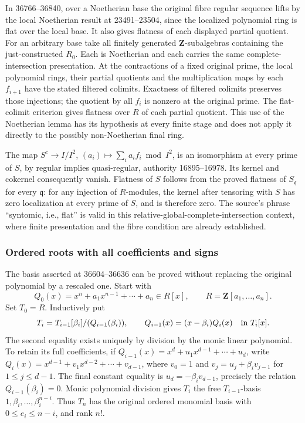 In 36766--36840, over a Noetherian base the original fibre regular sequence lifts by the local Noetherian result at 23491--23504, since the localized polynomial ring is flat over the local base. It also gives flatness of each displayed partial quotient. For an arbitrary base take all finitely generated \(\mathbf Z\)-subalgebras containing the just-constructed \(R_0\). Each is Noetherian and each carries the same complete-intersection presentation. At the contractions of a fixed original prime, the local polynomial rings, their partial quotients and the multiplication maps by each \(f_{i+1}\) have the stated filtered colimits. Exactness of filtered colimits preserves those injections; the quotient by all \(f_i\) is nonzero at the original prime. The flat-colimit criterion gives flatness over \(R\) of each partial quotient. This use of the Noetherian lemma has its hypothesis at every finite stage and does not apply it directly to the possibly non-Noetherian final ring.

The map \(S^c\to I/I^2\), \((a_i)\mapsto\sum_i a_i f_i\bmod I^2\), is an isomorphism at every prime of \(S\), by regular implies quasi-regular, authority 16895--16978. Its kernel and cokernel consequently vanish. Flatness of \(S\) follows from the proved flatness of \(S_{\mathfrak q}\) for every \(\mathfrak q\): for any injection of \(R\)-modules, the kernel after tensoring with \(S\) has zero localization at every prime of \(S\), and is therefore zero. The source's phrase ``syntomic, i.e., flat'' is valid in this relative-global-complete-intersection context, where finite presentation and the fibre condition are already established.

\subsubsection{Ordered roots with all coefficients and signs}\label{algebra-proof-046-ordered-roots-with-all-coefficients-and-signs}

The basis asserted at 36604--36636 can be proved without replacing the original polynomial by a rescaled one. Start with \[
Q_0(x)=x^n+a_1x^{n-1}+\cdots+a_n\in R[x],\qquad
R=\mathbf Z[a_1,\ldots,a_n].
\] Set \(T_0=R\). Inductively put \[
T_i=T_{i-1}[\beta_i]/(Q_{i-1}(\beta_i)),\qquad
Q_{i-1}(x)=(x-\beta_i)Q_i(x)\quad\hbox{in }T_i[x].
\] The second equality exists uniquely by division by the monic linear polynomial. To retain its full coefficients, if \(Q_{i-1}(x)=x^d+u_1x^{d-1}+\cdots+u_d\), write \(Q_i(x)=x^{d-1}+v_1x^{d-2}+\cdots+v_{d-1}\), where \(v_0=1\) and \(v_j=u_j+\beta_i v_{j-1}\) for \(1\le j\le d-1\). The final constant equality is \(u_d=-\beta_i v_{d-1}\), precisely the relation \(Q_{i-1}(\beta_i)=0\). Monic polynomial division gives \(T_i\) the free \(T_{i-1}\)-basis \(1,\beta_i,\ldots,\beta_i^{n-i}\). Thus \(T_n\) has the original ordered monomial basis with \(0\le e_i\le n-i\), and rank \(n!\).

